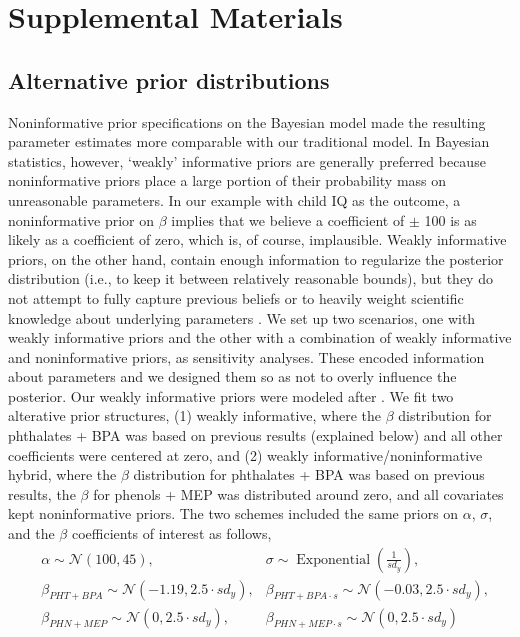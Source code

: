 \clearpage
{\setcounter{figure}{0} %
\setcounter{table}{0}
\renewcommand{\thefigure}{4.S.\arabic{figure}}
\renewcommand{\thetable}{4.S.\arabic{table}}
\section{Supplemental Materials}

\subsection{Alternative prior distributions}
\label{sec:priors}
Noninformative prior specifications on the Bayesian model made the resulting parameter estimates more comparable with our traditional model. In Bayesian statistics, however, `weakly' informative priors are generally preferred because noninformative priors place a large portion of their probability mass on unreasonable parameters. In our example with child IQ as the outcome, a noninformative prior on $\beta$ implies that we believe a coefficient of $\pm$ 100 is as likely as a coefficient of zero, which is, of course, implausible. Weakly informative priors, on the other hand, contain enough information to regularize the posterior distribution (i.e., to keep it between relatively reasonable bounds), but they do not attempt to fully capture previous beliefs or to heavily weight scientific knowledge about underlying parameters \citep{bda3}. We set up two scenarios, one with weakly informative priors and the other with a combination of weakly informative and noninformative priors, as sensitivity analyses. These encoded information about parameters and we designed them so as not to overly influence the posterior. Our weakly informative priors were modeled after \citet{gelman2020regression}. We fit two alterative prior structures, (1) weakly informative, where the $\beta$ distribution for phthalates + BPA was based on previous results (explained below) and all other coefficients were centered at zero, and (2) weakly informative/noninformative hybrid, where the $\beta$ distribution for phthalates + BPA was based on previous results, the $\beta$ for phenols + MEP was distributed around zero, and all covariates kept noninformative priors. The two schemes included the same priors on $\alpha$, $\sigma$, and the $\beta$ coefficients of interest as follows,
\begin{align*}
& \alpha \sim \mathcal{N}(100, 45), 
& \sigma \sim \operatorname{Exponential}(\frac{1}{sd_y}), \\
& \beta_{PHT+BPA} \sim \mathcal{N}(-1.19, 2.5 \cdot sd_y), 
& \beta_{PHT+BPA \cdot s} \sim \mathcal{N}(-0.03, 2.5 \cdot sd_y), \\
& \beta_{PHN+MEP} \sim \mathcal{N}(0, 2.5 \cdot sd_y), 
& \beta_{PHN+MEP \cdot s} \sim \mathcal{N}(0, 2.5 \cdot sd_y)
\end{align*}

}
